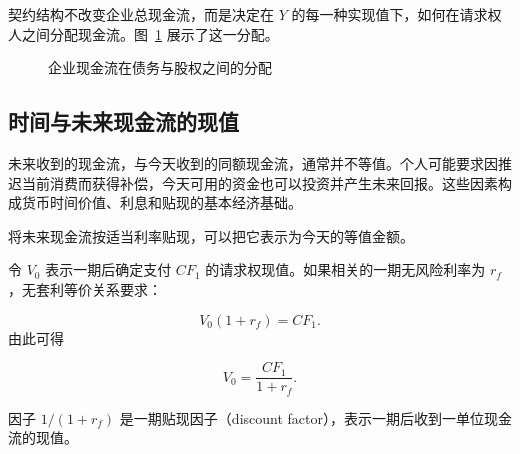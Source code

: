 契约结构不改变企业总现金流，而是决定在 $Y$ 的每一种实现值下，如何在请求权人之间分配现金流。图~\ref{fig:ch5-debt-equity-payoff} 展示了这一分配。

\begin{figure}[H]

\centering

\caption{企业现金流在债务与股权之间的分配}
\label{fig:ch5-debt-equity-payoff}

\end{figure}

\subsection{时间与未来现金流的现值}

未来收到的现金流，与今天收到的同额现金流，通常并不等值。个人可能要求因推迟当前消费而获得补偿，今天可用的资金也可以投资并产生未来回报。这些因素构成货币时间价值、利息和贴现的基本经济基础。

将未来现金流按适当利率贴现，可以把它表示为今天的等值金额。

令 \(V_0\) 表示一期后确定支付 \(CF_1\) 的请求权现值。如果相关的一期无风险利率为 \(r_f\)，无套利等价关系要求：

\begin{equation*}
V_0(1+r_{f})=CF_1.
\label{eq:ch5-one-period-equivalence}
\end{equation*}
由此可得

\begin{equation*}
V_0=\frac{CF_1}{1+r_{f}}.
\label{eq:ch5-one-period-pv}
\end{equation*}

因子 $1/(1+r_f)$ 是一期贴现因子（discount factor），表示一期后收到一单位现金流的现值。



